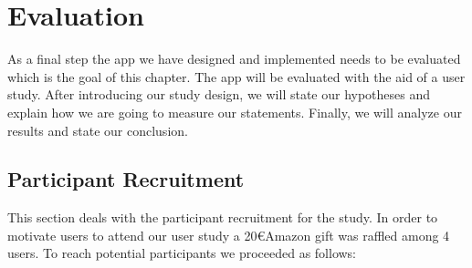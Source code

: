 \section{Evaluation}
\label{s:evaluation}
 As a final step the app we have designed and implemented needs to be evaluated which is the goal of this chapter.
 The app will be evaluated with the aid of a user study.
 After introducing our study design, we will state our hypotheses and explain how we are going to measure our statements.
 Finally, we will analyze our results and state our conclusion.


\subsection{Participant Recruitment}
\label{s:participant_recruitment}
This section deals with the participant recruitment for the study.
In order to motivate users to attend our user study a 20\euro Amazon gift was raffled among 4 users.
To reach potential participants we proceeded as follows:

